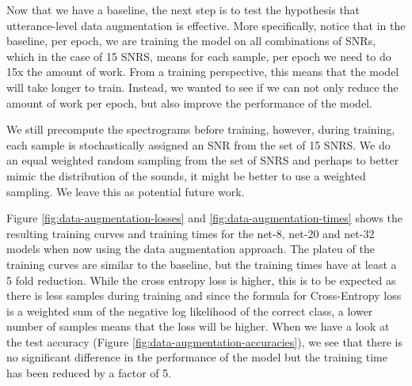 \documentclass[logo,bsc,singlespacing,parskip,online]{infthesis}
\begin{document}
Now that we have a baseline, the next step is to test the hypothesis 
that utterance-level data augmentation is effective. More specifically, 
notice that in the baseline, per epoch, we are training the model on all 
combinations of SNRs, which in the case of 15 SNRS, means for each sample,
per epoch we need to do 15x the amount of work. From a training perspective, 
this means that the model will take longer to train. Instead, we wanted 
to see if we can not only reduce the amount of work per epoch, but also 
improve the performance of the model.

We still precompute the spectrograms before training, however, during 
training, each sample is stochastically assigned an SNR from the set of 
15 SNRS. We do an equal weighted random sampling from the set of SNRS 
and perhaps to better mimic the distribution of the sounds, it might 
be better to use a weighted sampling. We leave this as 
potential future work.

Figure \ref{fig:data-augmentation-losses} and \ref{fig:data-augmentation-times} shows 
the resulting training curves and training times for the net-8, net-20 and net-32 models
when now using the data augmentation approach. The plateu of the training curves 
are similar to the baseline, but the training times have at least 
a 5 fold reduction. While the cross entropy loss is higher, this is 
to be expected as there is less samples during training and since the formula for 
Cross-Entropy loss is a weighted sum of the negative log likelihood of 
the correct class, a lower number of samples means that the loss 
will be higher. When we have a look at the test accuracy (Figure \ref{fig:data-augmentation-accuracies}),
we see that there is no significant difference in the performance of the model 
but the training time has been reduced by a factor of 5.
\end{document}
